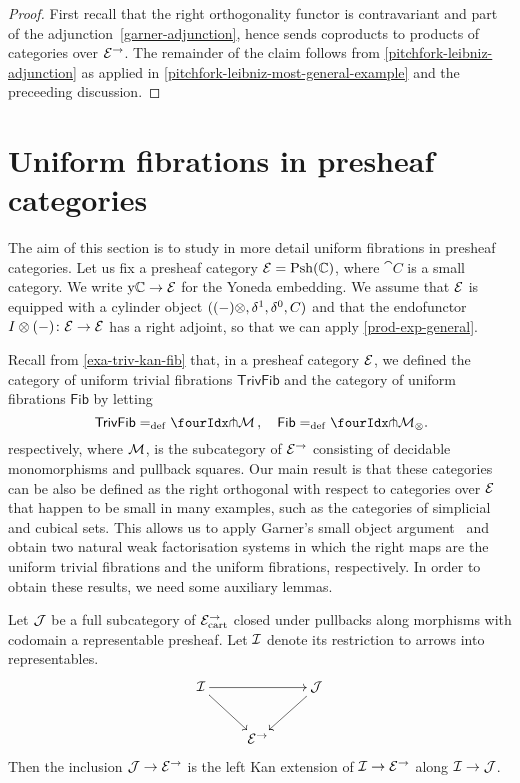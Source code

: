 \documentclass[reqno,10pt,a4paper,oneside,draft]{amsart}
\begin{document}
\begin{proof}
First recall that the right orthogonality functor is contravariant and part of the adjunction~\eqref{garner-adjunction}, hence sends coproducts to products of categories over $\cal{E}^\to$.
The remainder of the claim follows from \cref{pitchfork-leibniz-adjunction} as applied in \cref{pitchfork-leibniz-most-general-example} and the preceeding discussion.
\end{proof}


\section{Uniform fibrations in presheaf categories}
\label{sec:exinwf}

\newcommand{\Psh}{\mathrm{Psh}}

The aim of this section is to study in more detail uniform fibrations in presheaf categories.
Let us fix a presheaf category $\catE = \Psh(\cat{C})$, where $\cat{C}$ is a small category.
We write $\yon \catC \to \cal{E}$ for the Yoneda embedding.
We assume that $\cal{E}$ is equipped with a cylinder object $( (-)\otimes, \rcyl, \lcyl, \cyl)$ and that the endofunctor $ \interval\otimes (-) \co \cal{E} \to \cal{E}$ has a right adjoint, so that we can apply \cref{prod-exp-general}.



Recall from \cref{exa-triv-kan-fib} that, in a presheaf category $\cal{E}$, we defined the category of uniform trivial fibrations
$\mathsf{TrivFib}$ and the category of uniform fibrations $\mathsf{Fib}$ by letting
\[
\mathsf{TrivFib} \defeq \liftr{\cal{M}} \, , \quad \mathsf{Fib} \defeq \liftr{\cal{M}_\otimes} \rlap{.}
\]
respectively, where $\cal{M}$, is the subcategory of $\cal{E}^\to$ consisting of decidable monomorphisms and pullback squares.
Our main result is that these categories can be also be defined as the right orthogonal with respect to categories over
$\cal{E}$ that happen to be small in many examples, such as the categories of simplicial and cubical sets.
This allows us to apply Garner's small object argument~\cite{garner:small-object-argument} and obtain two natural weak factorisation systems in which the right maps are the uniform trivial fibrations and the uniform fibrations, respectively.
In order to obtain these results, we need some auxiliary lemmas.

\begin{lemma} \label{left-kan-extension-of-representables}
Let $\cal{J}$ be a full subcategory of $\catE_{\cart}^\to$ closed under pullbacks along morphisms with codomain a representable presheaf.
Let $\cal{I}$ denote its restriction to arrows into representables.
\[
\xymatrix{
  \cal{I}
  \ar[rr]
  \ar[dr]
&&
  \cal{J}
  \ar[dl]
\\&
  \catE^\to
}
\]
Then the inclusion $\cal{J} \to \catE^\to$ is the left Kan extension of $\cal{I} \to \catE^\to$ along $\cal{I} \to \cal{J}$.
\end{lemma}
\end{document}
